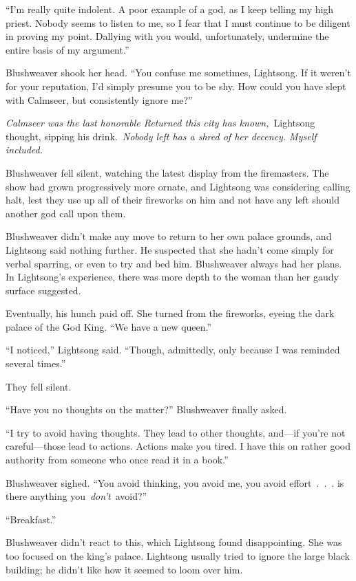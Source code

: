 “I’m really quite indolent. A poor example of a god, as I keep telling my high priest. Nobody seems to listen to me, so I fear that I must continue to be diligent in proving my point. Dallying with you would, unfortunately, undermine the entire basis of my argument.”

Blushweaver shook her head. “You confuse me sometimes, Lightsong. If it weren’t for your reputation, I’d simply presume you to be shy. How could you have slept with Calmseer, but consistently ignore me?”

\textit{Calmseer was the last honorable Returned this city has known,}~Lightsong thought, sipping his drink.~\textit{Nobody left has a shred of her decency. Myself included.}

Blushweaver fell silent, watching the latest display from the firemasters. The show had grown progressively more ornate, and Lightsong was considering calling halt, lest they use up all of their fireworks on him and not have any left should another god call upon them.

Blushweaver didn’t make any move to return to her own palace grounds, and Lightsong said nothing further. He suspected that she hadn’t come simply for verbal sparring, or even to try and bed him. Blushweaver always had her plans. In Lightsong’s experience, there was more depth to the woman than her gaudy surface suggested.

Eventually, his hunch paid off. She turned from the fireworks, eyeing the dark palace of the God King. “We have a new queen.”

“I noticed,” Lightsong said. “Though, admittedly, only because I was reminded several times.”

They fell silent.

“Have you no thoughts on the matter?” Blushweaver finally asked.

“I try to avoid having thoughts. They lead to other thoughts, and—if you’re not careful—those lead to actions. Actions make you tired. I have this on rather good authority from someone who once read it in a book.”

Blushweaver sighed. “You avoid thinking, you avoid me, you avoid effort~.~.~. is there anything you~\textit{don’t}~avoid?”

“Breakfast.”

Blushweaver didn’t react to this, which Lightsong found disappointing. She was too focused on the king’s palace. Lightsong usually tried to ignore the large black building; he didn’t like how it seemed to loom over him.


